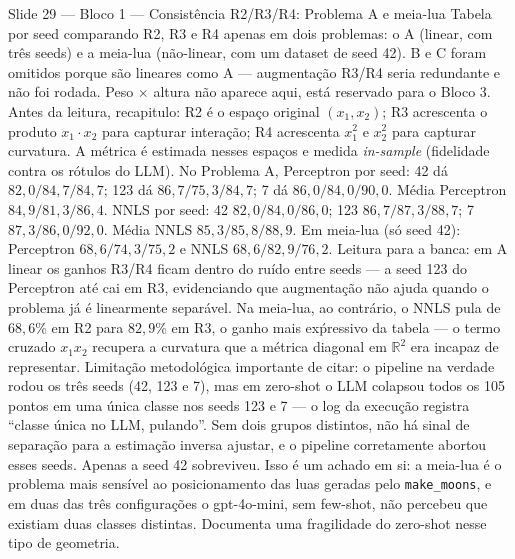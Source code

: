 \documentclass[aspectratio=169,10pt]{beamer}
\begin{document}
\begin{frame}{Slide 29 --- Bloco 1 --- Consist\^encia R2/R3/R4: Problema A e meia-lua}
\footnotesize
Tabela por seed comparando R2, R3 e R4 apenas em dois problemas: o A (linear, com tr\^es seeds) e a meia-lua (n\~ao-linear, com um dataset de seed 42). B e C foram omitidos porque s\~ao lineares como A --- augmenta\c{c}\~ao R3/R4 seria redundante e n\~ao foi rodada. Peso $\times$ altura n\~ao aparece aqui, est\'a reservado para o Bloco 3. Antes da leitura, recapitulo: R2 \'e o espa\c{c}o original $(x_1, x_2)$; R3 acrescenta o produto $x_1 \cdot x_2$ para capturar intera\c{c}\~ao; R4 acrescenta $x_1^2$ e $x_2^2$ para capturar curvatura. A m\'etrica \'e estimada nesses espa\c{c}os e medida \emph{in-sample} (fidelidade contra os r\'otulos do LLM). No Problema A, Perceptron por seed: 42 d\'a $82{,}0 / 84{,}7 / 84{,}7$; 123 d\'a $86{,}7 / 75{,}3 / 84{,}7$; 7 d\'a $86{,}0 / 84{,}0 / 90{,}0$. M\'edia Perceptron $84{,}9 / 81{,}3 / 86{,}4$. NNLS por seed: 42 $82{,}0 / 84{,}0 / 86{,}0$; 123 $86{,}7 / 87{,}3 / 88{,}7$; 7 $87{,}3 / 86{,}0 / 92{,}0$. M\'edia NNLS $85{,}3 / 85{,}8 / 88{,}9$. Em meia-lua (s\'o seed 42): Perceptron $68{,}6 / 74{,}3 / 75{,}2$ e NNLS $68{,}6 / 82{,}9 / 76{,}2$. Leitura para a banca: em A linear os ganhos R3/R4 ficam dentro do ru\'ido entre seeds --- a seed 123 do Perceptron at\'e cai em R3, evidenciando que augmenta\c{c}\~ao n\~ao ajuda quando o problema j\'a \'e linearmente separ\'avel. Na meia-lua, ao contr\'ario, o NNLS pula de $68{,}6\%$ em R2 para $82{,}9\%$ em R3, o ganho mais ex\'pressivo da tabela --- o termo cruzado $x_1 x_2$ recupera a curvatura que a m\'etrica diagonal em $\mathbb{R}^2$ era incapaz de representar. Limita\c{c}\~ao metodol\'ogica importante de citar: o pipeline na verdade rodou os tr\^es seeds (42, 123 e 7), mas em zero-shot o LLM colapsou todos os 105 pontos em uma \'unica classe nos seeds 123 e 7 --- o log da execu\c{c}\~ao registra ``classe \'unica no LLM, pulando''. Sem dois grupos distintos, n\~ao h\'a sinal de separa\c{c}\~ao para a estima\c{c}\~ao inversa ajustar, e o pipeline corretamente abortou esses seeds. Apenas a seed 42 sobreviveu. Isso \'e um achado em si: a meia-lua \'e o problema mais sens\'ivel ao posicionamento das luas geradas pelo \texttt{make\_moons}, e em duas das tr\^es configura\c{c}\~oes o gpt-4o-mini, sem few-shot, n\~ao percebeu que existiam duas classes distintas. Documenta uma fragilidade do zero-shot nesse tipo de geometria.
\end{frame}
\end{document}
